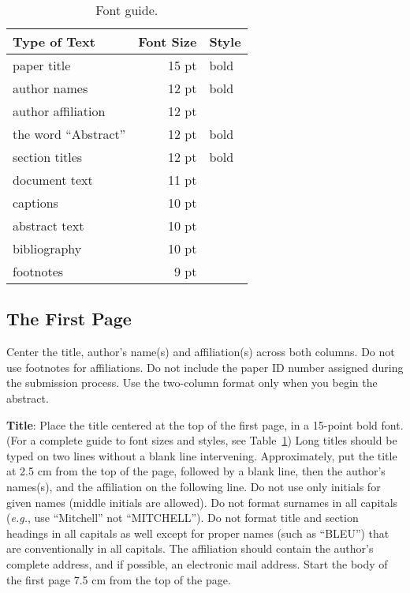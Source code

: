 \documentclass[11pt,a4paper]{article}
\begin{document}
\begin{table}[t!]
\begin{center}
\begin{tabular}{|l|rl|}
\hline \bf Type of Text & \bf Font Size & \bf Style \\ \hline
paper title & 15 pt & bold \\
author names & 12 pt & bold \\
author affiliation & 12 pt & \\
the word ``Abstract'' & 12 pt & bold \\
section titles & 12 pt & bold \\
document text & 11 pt  &\\
captions & 10 pt & \\
abstract text & 10 pt & \\
bibliography & 10 pt & \\
footnotes & 9 pt & \\
\hline
\end{tabular}
\end{center}
\caption{\label{font-table} Font guide. }
\end{table}

\subsection{The First Page}
\label{ssec:first}

Center the title, author's name(s) and affiliation(s) across both
columns. Do not use footnotes for affiliations. Do not include the
paper ID number assigned during the submission process. Use the
two-column format only when you begin the abstract.

{\bf Title}: Place the title centered at the top of the first page, in
a 15-point bold font. (For a complete guide to font sizes and styles,
see Table~\ref{font-table}) Long titles should be typed on two lines
without a blank line intervening. Approximately, put the title at 2.5
cm from the top of the page, followed by a blank line, then the
author's names(s), and the affiliation on the following line. Do not
use only initials for given names (middle initials are allowed). Do
not format surnames in all capitals ({\em e.g.}, use ``Mitchell'' not
``MITCHELL'').  Do not format title and section headings in all
capitals as well except for proper names (such as ``BLEU'') that are
conventionally in all capitals.  The affiliation should contain the
author's complete address, and if possible, an electronic mail
address. Start the body of the first page 7.5 cm from the top of the
page.
\end{document}
